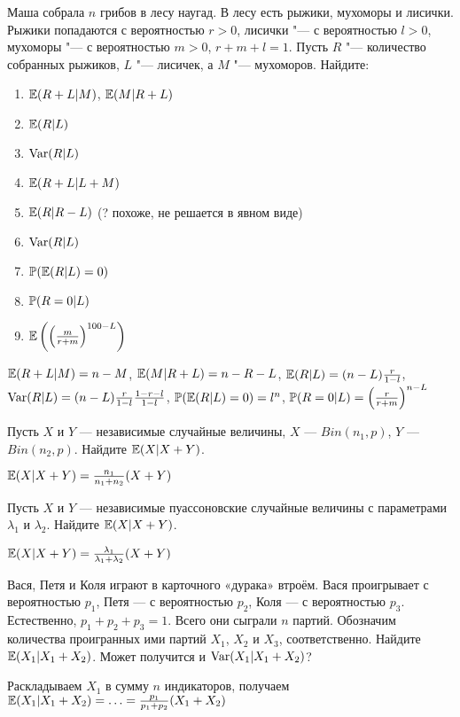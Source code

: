 \begin{problem}
Маша собрала $n$ грибов в лесу наугад. В лесу есть рыжики, мухоморы и лисички. Рыжики попадаются с вероятностью $r>0$, лисички "--- с вероятностью $l>0$,  мухоморы "--- с вероятностью $m>0$, $r+m+l=1$. Пусть $R$ "--- количество собранных рыжиков, $L$ "--- лисичек, а $M$ "--- мухоморов. Найдите:
\begin{enumerate}
\item $\E(R+L|M)$, $\E(M|R+L)$
\item $\E(R|L)$
\item $\Var(R|L)$
\item $\E(R+L|L+M)$
\item $\E(R|R-L)$ (? похоже, не решается в явном виде)
\item $\Var(R|L)$
\item $\P(\E(R|L)=0)$
\item $\P(R=0 | L)$
\item $\E \left( \left( \frac{m}{r+m} \right)^{100-L} \right)$
\end{enumerate}

\begin{sol}
$\E(R+L|M)=n-M$, $\E(M|R+L)=n-R-L$, $\E(R|L)=(n-L)\frac{r}{1-l}$, $\Var(R|L)=(n-L)\frac{r}{1-l}\frac{1-r-l}{1-l}$, $\P(\E(R|L)=0)=l^{n}$, $\P(R=0 | L)=\left(\frac{r}{r+m}\right)^{n-L}$
\end{sol}
\end{problem}

\begin{problem}
 Пусть $X$ и $Y$ — независимые случайные величины, $X$ — $Bin(n_{1},p)$, $Y$ — $Bin(n_{2},p)$. Найдите $\E(X|X+Y)$.

\begin{sol}
$\E(X|X+Y)=\frac{n_{1}}{n_{1}+n_{2}}(X+Y)$
\end{sol}
\end{problem}

\begin{problem}
 Пусть $X$ и $Y$ — независимые пуассоновские случайные величины с параметрами $\lambda_{1}$ и $\lambda_{2}$. Найдите $\E(X|X+Y)$.

\begin{sol}
$\E(X|X+Y)=\frac{\lambda_{1}}{\lambda_{1}+\lambda_{2}}(X+Y)$
\end{sol}
\end{problem}

\begin{problem}
Вася, Петя и Коля играют в карточного «дурака» втроём. Вася проигрывает с вероятностью $p_1$, Петя — с вероятностью $p_2$, Коля — с вероятностью $p_3$. Естественно, $p_1+p_2+p_3=1$. Всего они сыграли $n$ партий. Обозначим количества проигранных ими партий $X_1$, $X_2$ и $X_3$, соответственно. Найдите $\E(X_1|X_1+X_2)$. Может получится и $\Var(X_1|X_1+X_2)$?

\begin{sol}
Раскладываем $X_1$ в сумму $n$ индикаторов, получаем $\E(X_1|X_1+X_2)=\ldots=\frac{p_1}{p_1+p_2}(X_1+X_2)$
\end{sol}
\end{problem}

